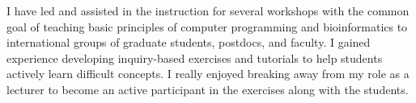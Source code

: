 


I have led and assisted in the instruction for several workshops with the
common goal of teaching basic principles of computer programming and
bioinformatics to international groups of graduate students, postdocs, and
faculty.
I gained experience developing inquiry-based exercises and tutorials
to help students actively learn difficult concepts.
I really enjoyed breaking away from my role as a lecturer to become an active
participant in the exercises along with the students.


